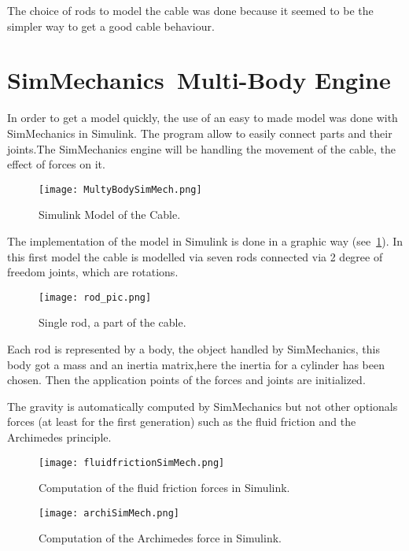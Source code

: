 The choice of rods to model the cable was done because it seemed to be the simpler
way to get a good cable behaviour.

\section{SimMechanics\texttrademark ~Multi-Body Engine}

In order to get a model quickly, the use of an easy to made model was done with SimMechanics in Simulink.
The program allow to easily connect parts and their joints.The SimMechanics engine will be handling the movement of the cable, the effect of forces on it.

\begin{figure}[H]
\centering
    \texttt{[image: MultyBodySimMech.png]}
    \caption{Simulink Model of the Cable.}
    \label{fig:SimulinkFullMod}
\end{figure}

The implementation of the model in Simulink is done in a graphic way (see~\ref{fig:SimulinkFullMod}). In
this first model the cable is modelled via seven rods connected via 2 degree of freedom joints, which are rotations.

\begin{figure}[H]
\centering
    \texttt{[image: rod\_pic.png]}
    \caption{Single rod, a part of the cable.}
    \label{fig:SingleRod}
\end{figure}

Each rod is represented by a body, the object handled by SimMechanics, this body got a mass and an inertia matrix,here the inertia for a cylinder has been chosen. Then the application points of the forces and joints are
initialized.

The gravity is automatically computed by SimMechanics but not other optionals forces (at least for the first generation) such as the fluid friction and the Archimedes principle. 

\begin{figure}[H]
\centering
    \begin{minipage}[b]{0.4\textwidth}
    \centering
    \texttt{[image: fluidfrictionSimMech.png]}
    \caption{Computation of the fluid friction forces in Simulink.}
    \label{fig:fluidSimMech}
    \end{minipage}
    \hfill
    \begin{minipage}[b]{0.4\textwidth}
    \centering
    \texttt{[image: archiSimMech.png]}
    \caption{Computation of the Archimedes force in Simulink.}
    \label{fig:archSimMech}
    \end{minipage}
\end{figure}

